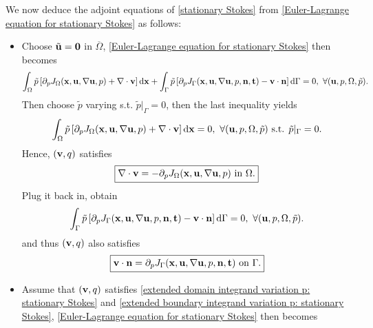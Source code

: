 \documentclass[oneside]{book}
\numberwithin{equation}{section}
\begin{document}
\begin{itemize}
    We now deduce the adjoint equations of \eqref{stationary Stokes} from \eqref{Euler-Lagrange equation for stationary Stokes} as follows:
    \begin{itemize}
        \item Choose $\tilde{\bf u} = {\bf 0}$ in $\overline{\Omega}$, \eqref{Euler-Lagrange equation for stationary Stokes} then becomes
        \begin{align*}
            \int_\Omega \tilde{p}\left[\partial_pJ_\Omega({\bf x},{\bf u},\nabla{\bf u},p) + \nabla\cdot{\bf v}\right]{\rm d}{\bf x} + \int_\Gamma  \tilde{p}\left[\partial_pJ_\Gamma({\bf x},{\bf u},\nabla{\bf u},p,{\bf n},{\bf t}) - {\bf v}\cdot{\bf n}\right]{\rm d}\Gamma = 0,\ \forall({\bf u},p,\Omega,\tilde{p}).
        \end{align*}
        Then choose $\tilde{p}$ varying s.t. $\tilde{p}|_\Gamma = 0$, then the last inequality yields
        \begin{align*}
            \int_\Omega \tilde{p}\left[\partial_pJ_\Omega({\bf x},{\bf u},\nabla{\bf u},p) + \nabla\cdot{\bf v}\right]{\rm d}{\bf x} = 0,\ \forall({\bf u},p,\Omega,\tilde{p}) \mbox{ s.t. } \tilde{p}|_\Gamma = 0.
        \end{align*}
        Hence, $({\bf v},q)$ satisfies
        \begin{align}
            \label{extended domain integrand variation p: stationary Stokes}
            \boxed{\nabla\cdot{\bf v} = -\partial_pJ_\Omega({\bf x},{\bf u},\nabla{\bf u},p) \mbox{ in } \Omega.}
        \end{align}
        Plug it back in, obtain
        \begin{align*}
            \int_\Gamma  \tilde{p}\left[\partial_pJ_\Gamma({\bf x},{\bf u},\nabla{\bf u},p,{\bf n},{\bf t}) - {\bf v}\cdot{\bf n}\right]{\rm d}\Gamma = 0,\ \forall({\bf u},p,\Omega,\tilde{p}).
        \end{align*}
        and thus $({\bf v},q)$ also satisfies
        \begin{align}
            \label{extended boundary integrand variation p: stationary Stokes}
            \boxed{{\bf v}\cdot{\bf n} = \partial_pJ_\Gamma({\bf x},{\bf u},\nabla{\bf u},p,{\bf n},{\bf t}) \mbox{ on } \Gamma.}
        \end{align}
        \item Assume that $({\bf v},q)$ satisfies \eqref{extended domain integrand variation p: stationary Stokes} and \eqref{extended boundary integrand variation p: stationary Stokes}, \eqref{Euler-Lagrange equation for stationary Stokes} then becomes

\end{itemize}
\end{itemize}
\end{document}
